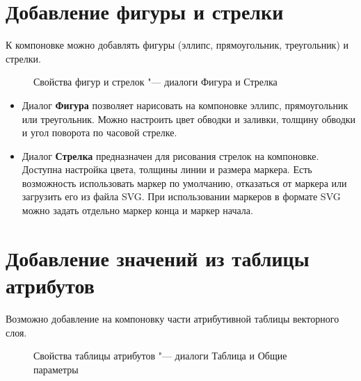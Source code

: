 \section{Добавление фигуры и стрелки}

К компоновке можно добавлять фигуры (эллипс, прямоугольник, треугольник)
и стрелки.

\begin{figure}[ht]
\centering
{}
\hspace{1cm}
\caption{Свойства фигур и стрелок "--- диалоги Фигура и Стрелка \wincaption}\label{fig:shapearrow}
\end{figure}

\begin{itemize}[label=--]
\item Диалог \textbf{Фигура} позволяет нарисовать на компоновке эллипс,
прямоугольник или треугольник. Можно настроить цвет обводки и заливки,
толщину обводки и угол поворота по часовой стрелке.
\item Диалог \textbf{Стрелка} предназначен для рисования стрелок на
компоновке. Доступна настройка цвета, толщины линии и размера маркера.
Есть возможность использовать маркер по умолчанию, отказаться от маркера
или загрузить его из файла SVG. При использовании маркеров в формате SVG
можно задать отдельно маркер конца и маркер начала.
\end{itemize}

\section{Добавление значений из таблицы атрибутов}

Возможно добавление на компоновку части атрибутивной таблицы векторного
слоя.

\begin{figure}[ht]
\centering
{}
\hspace{1cm}
\caption{Свойства таблицы атрибутов "--- диалоги Таблица и Общие параметры \wincaption}\label{fig:attrcomp}
\end{figure}

